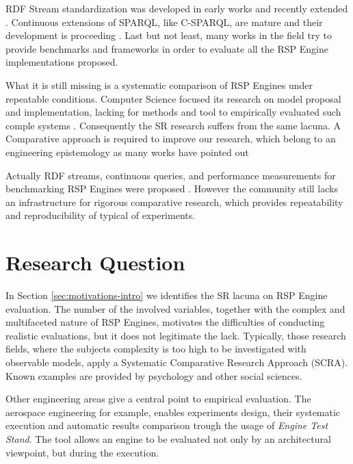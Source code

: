 RDF Stream standardization was developed in early works \cite{DBLP:journals/expert/ValleCHF09, Lephuoc2011} and recently extended \cite{DBLP:conf/semweb/BalduiniVDTPC13}. Continuous extensions of SPARQL, like C-SPARQL, are mature and their development is proceeding \cite{Barbieri2010}. Last but not least, many works in the field  \cite{Zhang2012,LePhuoc2012c}  try to provide benchmarks and frameworks in order to evaluate all the RSP Engine implementations proposed. 

What it is still missing is a systematic comparison of RSP Engines under repeatable conditions. Computer Science focused its research on model proposal and implementation, lacking for methods and tool to empirically evaluated such comple systems \cite{Perry:2000:ESS:336512.336586}. Consequently the SR research suffers from the same lacuna. A Comparative approach is required to improve our research, which belong to an engineering epistemology as many works have pointed out \cite{Tichy:1995:EEC:209090.209093,Wainer:2009:EEC:1518331.1518552}

Actually RDF streams, continuous queries, and performance measurements for benchmarking RSP Engines were proposed \cite{LePhuoc2012c,Zhang2012, DBLP:conf/semweb/DellAglioCBCV13}. However the community still lacks an infrastructure for rigorous comparative research, which provides repeatability and reproducibility of typical of experiments.


\section{Research Question}\label{sec:research-question-intro}

In Section \ref{sec:motivations-intro} we identifies the SR lacuna on RSP Engine evaluation. The number of the involved variables, together with the complex and multifaceted nature of RSP Engines, motivates the difficulties of conducting realistic evaluations, but it does not legitimate the lack. Typically, those research fields, where the subjects complexity is too high to be investigated with observable models, apply a Systematic Comparative Research Approach (SCRA). Known examples are provided by psychology and other social sciences.

Other engineering areas give a central point to empirical evaluation. The aerospace engineering for example, enables experiments design, their systematic execution and automatic results comparison trough the usage of \textit{Engine Test Stand}. The tool allows an engine to be evaluated not only by an architectural viewpoint, but during the execution.

